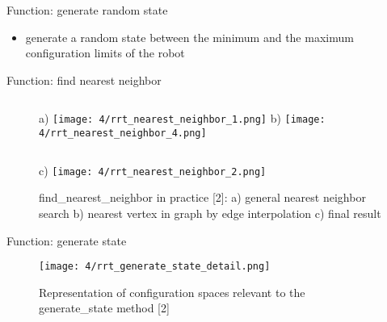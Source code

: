 \documentclass[%
  professionalfonts,%
  xcolor={%
    usenames,%
    dvipsnames,%
    svgnames,%
    table,%
    hyperref%
  }%
]{beamer}
\begin{document}
      \begin{frame}{Function: generate random state}
        \begin{itemize}
          \item generate a random state between the minimum and the maximum configuration limits of the robot
        \end{itemize}
        
      \end{frame}




\begin{frame}{Function: find nearest neighbor}
	\begin{figure}[h]
		\footnotesize
		\begin{columns}
			\vspace{-50pt}
			a)
			\texttt{[image: 4/rrt\_nearest\_neighbor\_1.png]}
			\vspace{-50pt}
			b)
			\texttt{[image: 4/rrt\_nearest\_neighbor\_4.png]}
		\end{columns}
		\vspace{15pt}
		\begin{columns}
			\column[c]{.25\textwidth}
			\column[c]{.01\textwidth}
			\vspace{-50pt}
			c)
			\column[c]{.49\textwidth}
			\texttt{[image: 4/rrt\_nearest\_neighbor\_2.png]}
			\column[c]{.25\textwidth}
		\end{columns}
		\caption{find\_nearest\_neighbor in practice [2]:\newline
			a) general nearest neighbor search\newline
			b) nearest vertex in graph by edge interpolation\newline
			c) final result}
	\end{figure}
	\vspace{-35pt}
\end{frame}

\begin{frame}{Function: generate state}
	\begin{figure}[h]
		\centering
		\texttt{[image: 4/rrt\_generate\_state\_detail.png]}
		\caption{Representation of configuration spaces relevant to the generate\_state method [2]}
	\end{figure}
\end{frame}
\end{document}
